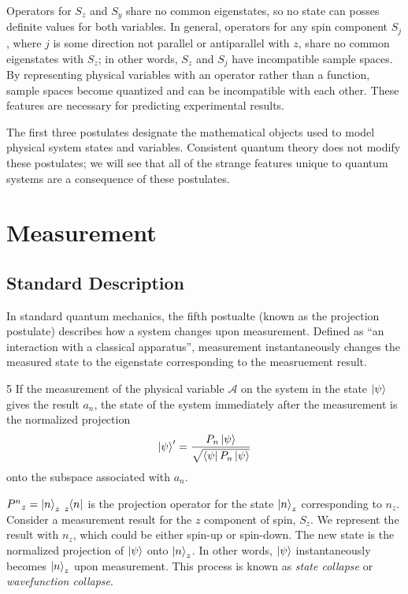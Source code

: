 Operators for $S_z$ and $S_y$ share no common eigenstates, so no state can posses definite values for both variables. In general, operators for any spin component $S_j$, where $j$ is some direction not parallel or antiparallel with $z$, share no common eigenstates with $S_z$; in other words, $S_z$ and $S_j$ have incompatible sample spaces. By representing physical variables with an operator rather than a function, sample spaces become quantized and can be incompatible with each other. These features are necessary for predicting experimental results.

The first three postulates designate the mathematical objects used to model physical system states and variables. Consistent quantum theory does not modify these postulates; we will see that all of the strange features unique to quantum systems are a consequence of these postulates.

\section{Measurement}
\label{Section:Measurement}
\subsection{Standard Description}
In standard quantum mechanics, the fifth postualte (known as the projection postulate) describes how a system changes upon measurement. Defined as ``an interaction with a classical apparatus'', measurement instantaneously changes the measured state to the eigenstate corresponding to the measruement result.

\begin{Thm:Postulate}{5}
    If the measurement of the physical variable $\mathcal{A}$ on the system in the state $\ket{\psi}$ gives the result $a_n$, the state of the system immediately after the measurement is the normalized projection
    \begin{align*}
        \ket{\psi}^\prime = \frac{P_n\ket{\psi}}{\sqrt{\bra{\psi}P_n\ket{\psi}
        }}
    \end{align*}
    onto the subspace associated with $a_n$.
\end{Thm:Postulate}

${P^n}_z = \ket{n}_z\tensor[_z]{\bra{n}}{}$ is the projection operator for the state $\ket{n}_z$ corresponding to $n_z$. Consider a measurement result for the $z$ component of spin, $S_z$. We represent the result with $n_z$, which could be either spin-up or spin-down. The new state is the normalized projection of $\ket{\psi}$ onto $\ket{n}_z$. In other words, $\ket{\psi}$ instantaneously becomes $\ket{n}_z$ upon measurement. This process is known as \textit{state collapse} or \textit{wavefunction collapse}.

